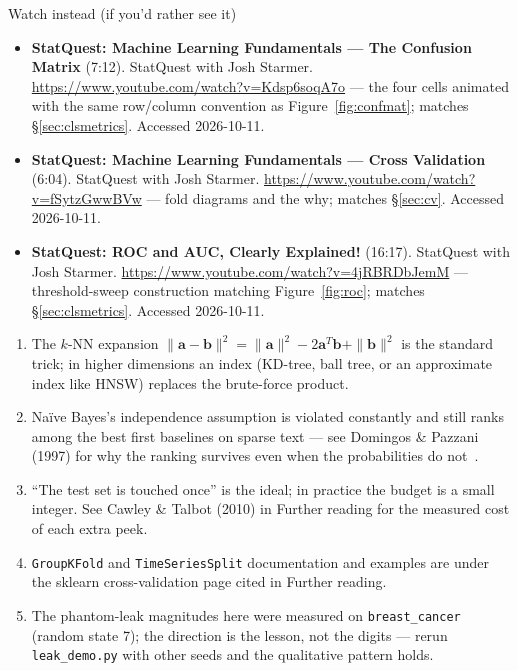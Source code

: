 \begin{rulebox}{Watch instead (if you'd rather see it)}
\begin{itemize}
\item \textbf{StatQuest: Machine Learning Fundamentals --- The Confusion
  Matrix} (7:12). StatQuest with Josh Starmer.
  \url{https://www.youtube.com/watch?v=Kdsp6soqA7o} --- the four cells
  animated with the same row/column convention as
  Figure~\ref{fig:confmat}; matches \S\ref{sec:clsmetrics}. Accessed
  2026-10-11.
\item \textbf{StatQuest: Machine Learning Fundamentals --- Cross
  Validation} (6:04). StatQuest with Josh Starmer.
  \url{https://www.youtube.com/watch?v=fSytzGwwBVw} --- fold diagrams and
  the why; matches \S\ref{sec:cv}. Accessed 2026-10-11.
\item \textbf{StatQuest: ROC and AUC, Clearly Explained!} (16:17).
  StatQuest with Josh Starmer.
  \url{https://www.youtube.com/watch?v=4jRBRDbJemM} --- threshold-sweep
  construction matching Figure~\ref{fig:roc}; matches
  \S\ref{sec:clsmetrics}. Accessed 2026-10-11.
\end{itemize}
\end{rulebox}

\chapternotes
\begin{enumerate}
\item The $k$-NN expansion $\|\mathbf{a}-\mathbf{b}\|^2 =
  \|\mathbf{a}\|^2 - 2\mathbf{a}^T\mathbf{b} + \|\mathbf{b}\|^2$ is the
  standard trick; in higher dimensions an index (KD-tree, ball tree, or
  an approximate index like HNSW) replaces the brute-force product.
\item Na\"ive Bayes's independence assumption is violated constantly and
  still ranks among the best first baselines on sparse text --- see
  Domingos \& Pazzani (1997) for why the ranking survives even when the
  probabilities do not~\cite{domingos1997}.
\item ``The test set is touched once'' is the ideal; in practice the
  budget is a small integer. See Cawley \& Talbot (2010) in Further
  reading for the measured cost of each extra peek.
\item \texttt{GroupKFold} and \texttt{TimeSeriesSplit} documentation and
  examples are under the sklearn cross-validation page cited in Further
  reading.
\item The phantom-leak magnitudes here were measured on
  \texttt{breast\_cancer} (random state 7); the direction is the lesson,
  not the digits --- rerun \texttt{leak\_demo.py} with other seeds and
  the qualitative pattern holds.
\end{enumerate}

